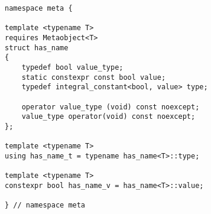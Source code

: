 
\begin{verbatim}
namespace meta {

template <typename T>
requires Metaobject<T>
struct has_name
{
	typedef bool value_type;
	static constexpr const bool value;
	typedef integral_constant<bool, value> type;

	operator value_type (void) const noexcept;
	value_type operator(void) const noexcept;
};

template <typename T>
using has_name_t = typename has_name<T>::type;

template <typename T>
constexpr bool has_name_v = has_name<T>::value;

} // namespace meta
\end{verbatim}

